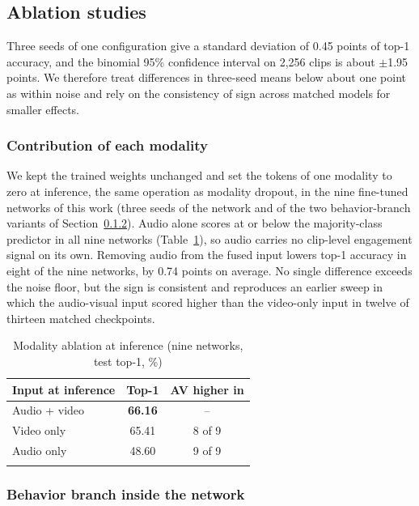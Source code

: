 \documentclass[pdflatex,iicol,sn-basic]{sn-jnl}
\begin{document}
\subsection{Ablation studies}\label{sec:ablation}

Three seeds of one configuration give a standard deviation of 0.45 points of top-1 accuracy, and the binomial 95\% confidence interval on 2,256 clips is about $\pm$1.95 points. We therefore treat differences in three-seed means below about one point as within noise and rely on the consistency of sign across matched models for smaller effects.

\subsubsection{Contribution of each modality}\label{sec:abl_modality}

We kept the trained weights unchanged and set the tokens of one modality to zero at inference, the same operation as modality dropout, in the nine fine-tuned networks of this work (three seeds of the network and of the two behavior-branch variants of Section~\ref{sec:abl_branch}). Audio alone scores at or below the majority-class predictor in all nine networks (Table~\ref{tab:modality}), so audio carries no clip-level engagement signal on its own. Removing audio from the fused input lowers top-1 accuracy in eight of the nine networks, by 0.74 points on average. No single difference exceeds the noise floor, but the sign is consistent and reproduces an earlier sweep in which the audio-visual input scored higher than the video-only input in twelve of thirteen matched checkpoints.

\begin{table}[t]
\caption{Modality ablation at inference (nine networks, test top-1, \%)}\label{tab:modality}
\begin{tabular*}{\columnwidth}{@{\extracolsep\fill}lcc}
\toprule
Input at inference & Top-1 & AV higher in\\
\midrule
Audio + video & \textbf{66.16} & --\\
Video only & 65.41 & 8 of 9\\
Audio only & 48.60 & 9 of 9\\
\botrule
\end{tabular*}
\end{table}

\subsubsection{Behavior branch inside the network}\label{sec:abl_branch}
\end{document}
